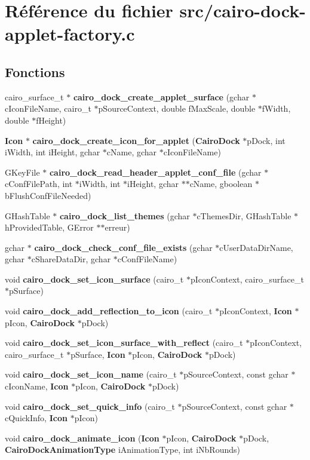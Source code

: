 \section{R\'{e}f\'{e}rence du fichier src/cairo-dock-applet-factory.c}
\label{cairo-dock-applet-factory_8c}
\subsection*{Fonctions}
\begin{CompactItemize}
\item 
cairo\_\-surface\_\-t $\ast$ {\bf cairo\_\-dock\_\-create\_\-applet\_\-surface} (gchar $\ast$c\-Icon\-File\-Name, cairo\_\-t $\ast$p\-Source\-Context, double f\-Max\-Scale, double $\ast$f\-Width, double $\ast$f\-Height)
\item 
{\bf Icon} $\ast$ {\bf cairo\_\-dock\_\-create\_\-icon\_\-for\_\-applet} ({\bf Cairo\-Dock} $\ast$p\-Dock, int i\-Width, int i\-Height, gchar $\ast$c\-Name, gchar $\ast$c\-Icon\-File\-Name)
\item 
GKey\-File $\ast$ {\bf cairo\_\-dock\_\-read\_\-header\_\-applet\_\-conf\_\-file} (gchar $\ast$c\-Conf\-File\-Path, int $\ast$i\-Width, int $\ast$i\-Height, gchar $\ast$$\ast$c\-Name, gboolean $\ast$b\-Flush\-Conf\-File\-Needed)
\item 
GHash\-Table $\ast$ {\bf cairo\_\-dock\_\-list\_\-themes} (gchar $\ast$c\-Themes\-Dir, GHash\-Table $\ast$h\-Provided\-Table, GError $\ast$$\ast$erreur)
\item 
gchar $\ast$ {\bf cairo\_\-dock\_\-check\_\-conf\_\-file\_\-exists} (gchar $\ast$c\-User\-Data\-Dir\-Name, gchar $\ast$c\-Share\-Data\-Dir, gchar $\ast$c\-Conf\-File\-Name)
\item 
void {\bf cairo\_\-dock\_\-set\_\-icon\_\-surface} (cairo\_\-t $\ast$p\-Icon\-Context, cairo\_\-surface\_\-t $\ast$p\-Surface)
\item 
void {\bf cairo\_\-dock\_\-add\_\-reflection\_\-to\_\-icon} (cairo\_\-t $\ast$p\-Icon\-Context, {\bf Icon} $\ast$p\-Icon, {\bf Cairo\-Dock} $\ast$p\-Dock)
\item 
void {\bf cairo\_\-dock\_\-set\_\-icon\_\-surface\_\-with\_\-reflect} (cairo\_\-t $\ast$p\-Icon\-Context, cairo\_\-surface\_\-t $\ast$p\-Surface, {\bf Icon} $\ast$p\-Icon, {\bf Cairo\-Dock} $\ast$p\-Dock)
\item 
void {\bf cairo\_\-dock\_\-set\_\-icon\_\-name} (cairo\_\-t $\ast$p\-Source\-Context, const gchar $\ast$c\-Icon\-Name, {\bf Icon} $\ast$p\-Icon, {\bf Cairo\-Dock} $\ast$p\-Dock)
\item 
void {\bf cairo\_\-dock\_\-set\_\-quick\_\-info} (cairo\_\-t $\ast$p\-Source\-Context, const gchar $\ast$c\-Quick\-Info, {\bf Icon} $\ast$p\-Icon)
\item 
void {\bf cairo\_\-dock\_\-animate\_\-icon} ({\bf Icon} $\ast$p\-Icon, {\bf Cairo\-Dock} $\ast$p\-Dock, {\bf Cairo\-Dock\-Animation\-Type} i\-Animation\-Type, int i\-Nb\-Rounds)
\end{CompactItemize}
